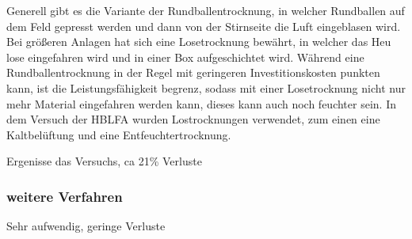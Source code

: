 Generell gibt es die Variante der Rundballentrocknung, in welcher Rundballen auf dem Feld gepresst werden und dann von der Stirnseite die Luft eingeblasen wird.
Bei größeren Anlagen hat sich eine Losetrocknung bewährt, in welcher das Heu lose eingefahren wird und in einer Box aufgeschichtet wird.
Während eine Rundballentrocknung in der Regel mit geringeren Investitionskosten punkten kann, ist die Leistungsfähigkeit begrenz, sodass mit einer Losetrocknung nicht nur mehr Material eingefahren werden kann, dieses kann auch noch feuchter sein.
In dem Versuch der \ac{HBLFA} wurden Lostrocknungen verwendet, zum einen eine Kaltbelüftung und eine Entfeuchtertrocknung.

Ergenisse das Versuchs, ca 21\% Verluste 

\subsubsection{weitere Verfahren}
\label{subsub:Peletts}
Sehr aufwendig, geringe Verluste \parencite[12f]{engel2013protein}


